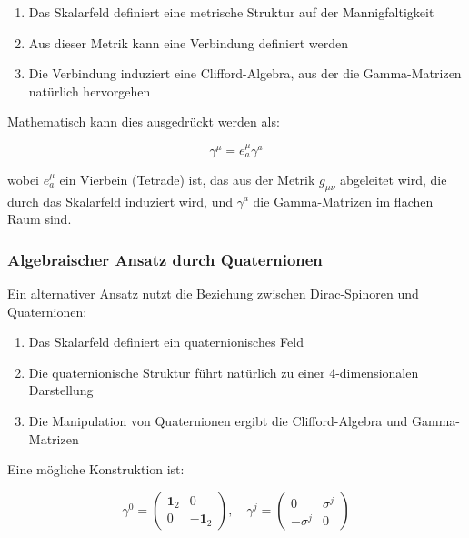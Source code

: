 \documentclass[12pt,a4paper]{article}
\begin{document}
	\begin{enumerate}
		\item Das Skalarfeld definiert eine metrische Struktur auf der Mannigfaltigkeit
		\item Aus dieser Metrik kann eine Verbindung definiert werden
		\item Die Verbindung induziert eine Clifford-Algebra, aus der die Gamma-Matrizen natürlich hervorgehen
	\end{enumerate}
	
	Mathematisch kann dies ausgedrückt werden als:
	
	\begin{equation}
		\gamma^{\mu} = e^{\mu}_a \gamma^a
		\label{eq:vierbein_relation}
	\end{equation}
	
	wobei $e^{\mu}_a$ ein Vierbein (Tetrade) ist, das aus der Metrik $g_{\mu\nu}$ abgeleitet wird, die durch das Skalarfeld induziert wird, und $\gamma^a$ die Gamma-Matrizen im flachen Raum sind.
	
	\subsubsection{Algebraischer Ansatz durch Quaternionen}
	\label{subsubsec:quaternion_approach}
	
	Ein alternativer Ansatz nutzt die Beziehung zwischen Dirac-Spinoren und Quaternionen:
	
	\begin{enumerate}
		\item Das Skalarfeld definiert ein quaternionisches Feld
		\item Die quaternionische Struktur führt natürlich zu einer 4-dimensionalen Darstellung
		\item Die Manipulation von Quaternionen ergibt die Clifford-Algebra und Gamma-Matrizen
	\end{enumerate}
	
	Eine mögliche Konstruktion ist:
	
	\begin{equation}
		\gamma^0 = \begin{pmatrix} \mathbf{1}_2 & 0 \\ 0 & -\mathbf{1}_2 \end{pmatrix}, \quad
		\gamma^j = \begin{pmatrix} 0 & \sigma^j \\ -\sigma^j & 0 \end{pmatrix}
		\label{eq:gamma_construction}
	\end{equation}
	
\end{document}

